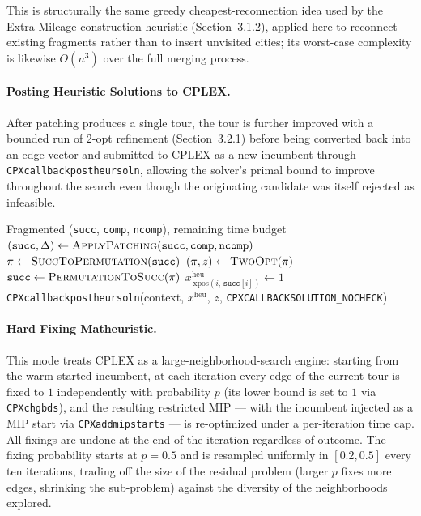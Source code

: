 \documentclass{article}
\begin{document}
This is structurally the same greedy cheapest-reconnection idea used by the Extra Mileage
construction heuristic (Section~3.1.2), applied here to reconnect existing fragments rather
than to insert unvisited cities; its worst-case complexity is likewise $O(n^3)$ over the full
merging process.

\paragraph{Posting Heuristic Solutions to CPLEX.}
After patching produces a single tour, the tour is further improved with a bounded run of
2-opt refinement (Section~3.2.1) before being converted back into an edge vector and
submitted to CPLEX as a new incumbent through \texttt{CPXcallbackpostheursoln}, allowing the
solver's primal bound to improve throughout the search even though the originating candidate
was itself rejected as infeasible.

\begin{algorithm}[H]
\caption{Posting a Refined Heuristic Solution to CPLEX (\texttt{post\_heuristic\_solution})}
\label{alg:post_heur}
\begin{algorithmic}[1]
\Require Fragmented (\texttt{succ}, \texttt{comp}, \texttt{ncomp}), remaining time budget
\State $(\texttt{succ}, \Delta) \leftarrow \textsc{ApplyPatching}(\texttt{succ}, \texttt{comp}, \texttt{ncomp})$ 
\State $\pi \leftarrow \textsc{SuccToPermutation}(\texttt{succ})$
    \State $(\pi, z) \leftarrow \textsc{TwoOpt}(\pi)$ 
\EndIf
\State $\texttt{succ} \leftarrow \textsc{PermutationToSucc}(\pi)$
    \State $x^{\text{heu}}_{\,\text{xpos}(i,\,\texttt{succ}[i])} \leftarrow 1$
\EndFor
\State \texttt{CPXcallbackpostheursoln}(context, $x^{\text{heu}}$, $z$, \texttt{CPXCALLBACKSOLUTION\_NOCHECK})
\end{algorithmic}
\end{algorithm}

\paragraph{Hard Fixing Matheuristic.}
This mode treats CPLEX as a large-neighborhood-search engine: starting from the warm-started
incumbent, at each iteration every edge of the current tour is fixed to $1$ independently with
probability $p$ (its lower bound is set to $1$ via \texttt{CPXchgbds}), and the resulting
restricted MIP --- with the incumbent injected as a MIP start via \texttt{CPXaddmipstarts} ---
is re-optimized under a per-iteration time cap. All fixings are undone at the end of the
iteration regardless of outcome. The fixing probability starts at $p = 0.5$ and is resampled
uniformly in $[0.2, 0.5]$ every ten iterations, trading off the size of the residual problem
(larger $p$ fixes more edges, shrinking the sub-problem) against the diversity of the
neighborhoods explored.
\end{document}
